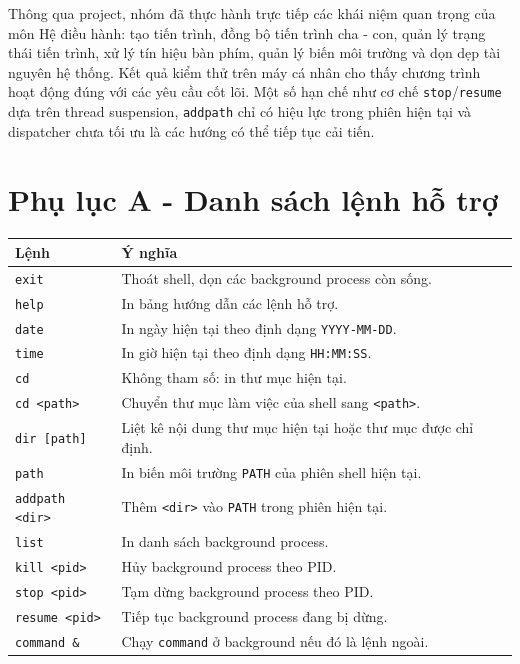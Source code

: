 \documentclass[13pt,a4paper,oneside]{extreport}
\begin{document}
Thông qua project, nhóm đã thực hành trực tiếp các khái niệm quan trọng của môn Hệ điều hành: tạo tiến trình, đồng bộ tiến trình cha - con, quản lý trạng thái tiến trình, xử lý tín hiệu bàn phím, quản lý biến môi trường và dọn dẹp tài nguyên hệ thống. Kết quả kiểm thử trên máy cá nhân cho thấy chương trình hoạt động đúng với các yêu cầu cốt lõi. Một số hạn chế như cơ chế \texttt{stop}/\texttt{resume} dựa trên thread suspension, \texttt{addpath} chỉ có hiệu lực trong phiên hiện tại và dispatcher chưa tối ưu là các hướng có thể tiếp tục cải tiến.

\appendix
\chapter{Phụ lục A - Danh sách lệnh hỗ trợ}

\begin{longtable}{|p{4cm}|p{10.5cm}|}
	\hline
	\textbf{Lệnh}          & \textbf{Ý nghĩa}                                              \\
	\hline
	\texttt{exit}          & Thoát shell, dọn các background process còn sống.             \\
	\hline
	\texttt{help}          & In bảng hướng dẫn các lệnh hỗ trợ.                            \\
	\hline
	\texttt{date}          & In ngày hiện tại theo định dạng \texttt{YYYY-MM-DD}.          \\
	\hline
	\texttt{time}          & In giờ hiện tại theo định dạng \texttt{HH:MM:SS}.             \\
	\hline
	\texttt{cd}            & Không tham số: in thư mục hiện tại.                           \\
	\hline
	\texttt{cd <path>}     & Chuyển thư mục làm việc của shell sang \texttt{<path>}.       \\
	\hline
	\texttt{dir [path]}    & Liệt kê nội dung thư mục hiện tại hoặc thư mục được chỉ định. \\
	\hline
	\texttt{path}          & In biến môi trường \texttt{PATH} của phiên shell hiện tại.    \\
	\hline
	\texttt{addpath <dir>} & Thêm \texttt{<dir>} vào \texttt{PATH} trong phiên hiện tại.   \\
	\hline
	\texttt{list}          & In danh sách background process.                              \\
	\hline
	\texttt{kill <pid>}    & Hủy background process theo PID.                              \\
	\hline
	\texttt{stop <pid>}    & Tạm dừng background process theo PID.                         \\
	\hline
	\texttt{resume <pid>}  & Tiếp tục background process đang bị dừng.                     \\
	\hline
	\texttt{command \&}    & Chạy \texttt{command} ở background nếu đó là lệnh ngoài.      \\
	\hline
\end{longtable}
\end{document}

